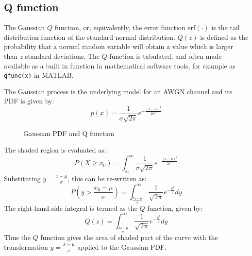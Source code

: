 \subsection{Q function}
The Gaussian \(Q\) function, or, equivalently, the error function \(\text{erf}(\cdot)\) is the tail distribution function of the standard normal distribution. \(Q(z)\) is defined as the probability that a normal random variable will obtain a value which is larger than \(z\) standard deviations\cite{qfuncber}.
The \(Q\) function is tabulated, and often made available as a built in function in mathematical software tools, for example as \texttt{qfunc(x)} in MATLAB.

The Gaussian process is the underlying model for an AWGN channel and its \gls{PDF} is given by:
\begin{equation}
	p(x) = \frac{1}{\sigma \sqrt{2\pi}}e^{-\frac{(x-\mu)^2}{2\sigma^2}}
\end{equation}
\begin{mathDef}
\end{mathDef}
\begin{figure}[!ht]
	\centering
	\resizebox{0.7\textwidth}{!}{}
	\caption{Gaussian PDF and Q function}
\end{figure}
The shaded region is evaluated as:
\begin{equation}
	P(X \geq x_0) = \int_{x_0}^\infty \frac{1}{\sigma \sqrt{2\pi}}e^{-\frac{(x-\mu)^2}{2\sigma^2}}
\end{equation}
Substituting \(y = \frac{x - \mu}{\sigma}\), this can be re-written as:
\begin{equation}
	P \left( y > \frac{x_0 - \mu}{\sigma}\right) = \int_{\frac{x_0 - \mu}{\sigma}}^{\infty} \frac{1}{\sqrt{2\pi}}e^{-\frac{y^2}{2}}dy
\end{equation}
The right-hand-side integral is termed as the \(Q\) function\cite{statistics}, given by:
\begin{equation}
	Q(z) = \int_{\frac{x_0 - \mu}{\sigma}}^{\infty} \frac{1}{\sqrt{2\pi}}e^{-\frac{y^2}{2}}dy
\end{equation}
Thus the \(Q\) function gives the area of shaded part of the curve with the transformation \(y = \frac{x - \mu}{\sigma}\) applied to the Gaussian \gls{PDF}.

